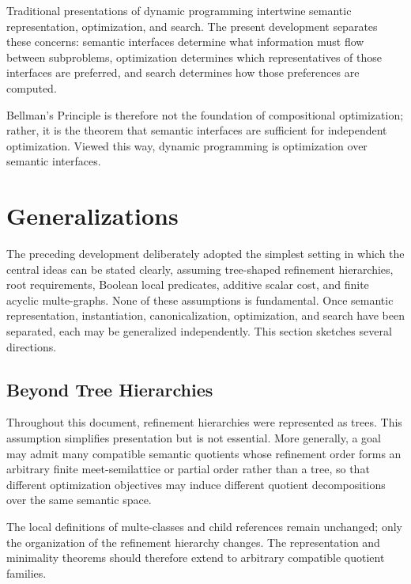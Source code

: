 \documentclass[sigconf,nonacm]{acmart}
\theoremstyle{definition}
\theoremstyle{plain}
\theoremstyle{remark}
\begin{document}
Traditional presentations of dynamic programming intertwine semantic
representation, optimization, and search.  The present development
separates these concerns: semantic interfaces determine what
information must flow between subproblems, optimization determines which
representatives of those interfaces are preferred, and search determines
how those preferences are computed.

Bellman's Principle is therefore not the foundation of compositional
optimization; rather, it is the theorem that semantic interfaces are
sufficient for independent optimization.  Viewed this way, dynamic
programming is optimization over semantic interfaces.

\section{Generalizations}
\label{sec:generalizations}

The preceding development deliberately adopted the simplest setting in
which the central ideas can be stated clearly, assuming tree-shaped
refinement hierarchies, root requirements, Boolean local predicates,
additive scalar cost, and finite acyclic multe-graphs.  None of these
assumptions is fundamental.  Once semantic representation,
instantiation, canonicalization, optimization, and search have been
separated, each may be generalized independently.  This section
sketches several directions.

\subsection{Beyond Tree Hierarchies}

Throughout this document, refinement hierarchies were represented as
trees.  This assumption simplifies presentation but is not essential.
More generally, a goal may admit many compatible semantic quotients
whose refinement order forms an arbitrary finite meet-semilattice or
partial order rather than a tree, so that different optimization
objectives may induce different quotient decompositions over the same
semantic space.

The local definitions of multe-classes and child references remain
unchanged; only the organization of the refinement hierarchy changes.
The representation and minimality theorems should therefore extend to
arbitrary compatible quotient families.
\end{document}
